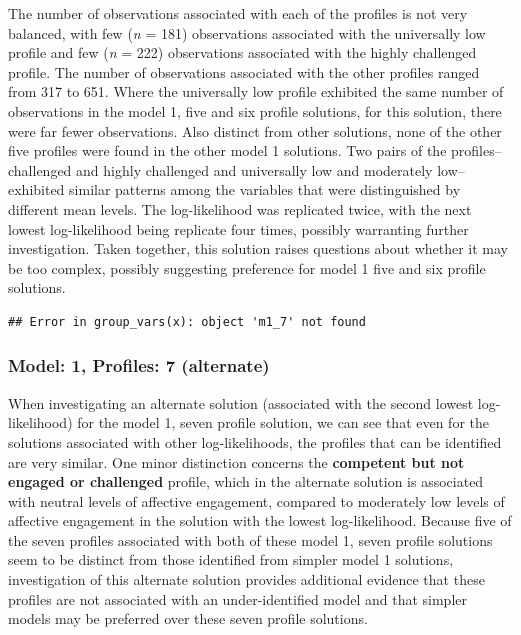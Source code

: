 \documentclass[]{book}
\theoremstyle{definition}
\theoremstyle{definition}
\theoremstyle{definition}
\theoremstyle{remark}
\begin{document}
The number of observations associated with each of the profiles is not
very balanced, with few (\emph{n} = 181) observations associated with
the universally low profile and few (\emph{n} = 222) observations
associated with the highly challenged profile. The number of
observations associated with the other profiles ranged from 317 to 651.
Where the universally low profile exhibited the same number of
observations in the model 1, five and six profile solutions, for this
solution, there were far fewer observations. Also distinct from other
solutions, none of the other five profiles were found in the other model
1 solutions. Two pairs of the profiles--challenged and highly challenged
and universally low and moderately low--exhibited similar patterns among
the variables that were distinguished by different mean levels. The
log-likelihood was replicated twice, with the next lowest log-likelihood
being replicate four times, possibly warranting further investigation.
Taken together, this solution raises questions about whether it may be
too complex, possibly suggesting preference for model 1 five and six
profile solutions.

\begin{verbatim}
## Error in group_vars(x): object 'm1_7' not found
\end{verbatim}

\subsubsection{Model: 1, Profiles: 7
(alternate)}\label{model-1-profiles-7-alternate}

When investigating an alternate solution (associated with the second
lowest log-likelihood) for the model 1, seven profile solution, we can
see that even for the solutions associated with other log-likelihoods,
the profiles that can be identified are very similar. One minor
distinction concerns the \textbf{competent but not engaged or
challenged} profile, which in the alternate solution is associated with
neutral levels of affective engagement, compared to moderately low
levels of affective engagement in the solution with the lowest
log-likelihood. Because five of the seven profiles associated with both
of these model 1, seven profile solutions seem to be distinct from those
identified from simpler model 1 solutions, investigation of this
alternate solution provides additional evidence that these profiles are
not associated with an under-identified model and that simpler models
may be preferred over these seven profile solutions.
\end{document}
